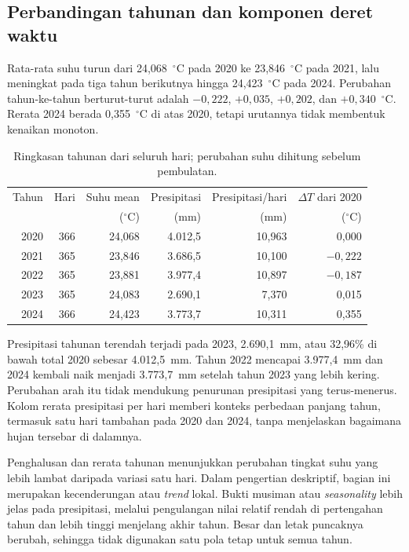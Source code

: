 \documentclass[12pt,a4paper]{article}
\begin{document}
\subsection{Perbandingan tahunan dan komponen deret waktu}
Rata-rata suhu turun dari 24,068~$^\circ$C pada 2020 ke 23,846~$^\circ$C pada 2021, lalu meningkat pada tiga tahun berikutnya hingga 24,423~$^\circ$C pada 2024. Perubahan tahun-ke-tahun berturut-turut adalah $-0{,}222$, $+0{,}035$, $+0{,}202$, dan $+0{,}340$~$^\circ$C. Rerata 2024 berada 0,355~$^\circ$C di atas 2020, tetapi urutannya tidak membentuk kenaikan monoton.
\begin{table}[htbp]\centering\footnotesize
\caption{Ringkasan tahunan dari seluruh hari; perubahan suhu dihitung sebelum pembulatan.}\label{tab:annual}
\begin{tabular}{@{}rrrrrr@{}}\toprule
Tahun & Hari & Suhu mean & Presipitasi & Presipitasi/hari & $\Delta T$ dari 2020\\
 & & ($^\circ$C) & (mm) & (mm) & ($^\circ$C)\\\midrule
2020 & 366 & 24,068 & 4.012,5 & 10,963 & 0,000\\
2021 & 365 & 23,846 & 3.686,5 & 10,100 & $-0,222$\\
2022 & 365 & 23,881 & 3.977,4 & 10,897 & $-0,187$\\
2023 & 365 & 24,083 & 2.690,1 & 7,370 & 0,015\\
2024 & 366 & 24,423 & 3.773,7 & 10,311 & 0,355\\\bottomrule
\end{tabular}
\end{table}
Presipitasi tahunan terendah terjadi pada 2023, 2.690,1~mm, atau 32,96\% di bawah total 2020 sebesar 4.012,5~mm. Tahun 2022 mencapai 3.977,4~mm dan 2024 kembali naik menjadi 3.773,7~mm setelah tahun 2023 yang lebih kering. Perubahan arah itu tidak mendukung penurunan presipitasi yang terus-menerus. Kolom rerata presipitasi per hari memberi konteks perbedaan panjang tahun, termasuk satu hari tambahan pada 2020 dan 2024, tanpa menjelaskan bagaimana hujan tersebar di dalamnya.

Penghalusan dan rerata tahunan menunjukkan perubahan tingkat suhu yang lebih lambat daripada variasi satu hari. Dalam pengertian deskriptif, bagian ini merupakan kecenderungan atau \emph{trend} lokal. Bukti musiman atau \emph{seasonality} lebih jelas pada presipitasi, melalui pengulangan nilai relatif rendah di pertengahan tahun dan lebih tinggi menjelang akhir tahun. Besar dan letak puncaknya berubah, sehingga tidak digunakan satu pola tetap untuk semua tahun.
\end{document}
